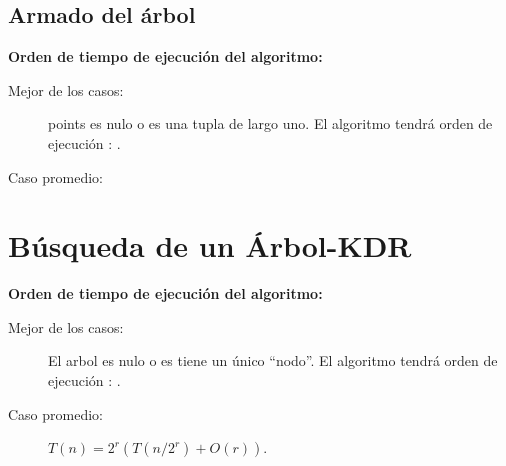 \subsection{Armado del árbol}



\textbf{Orden de tiempo de ejecución del algoritmo:}
\begin{description}
\item[Mejor de los casos:] points es nulo o es una tupla de largo uno.
  El algoritmo tendrá orden de ejecución : .
\item[Caso promedio:] 
\end{description}


\section{Búsqueda de un Árbol-KDR}



\textbf{Orden de tiempo de ejecución del algoritmo:}
\begin{description}
\item[Mejor de los casos:] El arbol es nulo o es tiene un único ``nodo''.
  El algoritmo tendrá orden de ejecución : .
\item[Caso promedio:] \(T(n)= 2^r (T(n/2^r)+ O(r))\).
\end{description}




